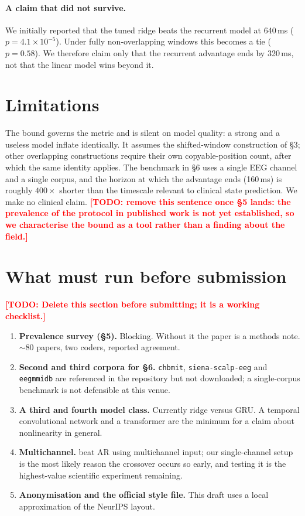 \documentclass{article}
\newcommand{\TODO}[1]{\textcolor{red}{\textbf{[TODO: #1]}}}
\begin{document}
\paragraph{A claim that did not survive.} We initially reported that the tuned
ridge beats the recurrent model at 640\,ms ($p=4.1\times10^{-5}$). Under fully
non-overlapping windows this becomes a tie ($p=0.58$). We therefore claim only that
the recurrent advantage ends by 320\,ms, not that the linear model wins beyond it.

\section{Limitations}

The bound governs the metric and is silent on model quality: a strong and a useless
model inflate identically. It assumes the shifted-window construction of \S3;
other overlapping constructions require their own copyable-position count, after
which the same identity applies. The benchmark in \S6 uses a single EEG channel and
a single corpus, and the horizon at which the advantage ends (160\,ms) is roughly
$400\times$ shorter than the timescale relevant to clinical state prediction. We
make no clinical claim. \TODO{remove this sentence once \S5 lands: the prevalence
of the protocol in published work is not yet established, so we characterise the
bound as a tool rather than a finding about the field.}

\section{What must run before submission}

\TODO{Delete this section before submitting; it is a working checklist.}
\begin{enumerate}\itemsep2pt
\item \textbf{Prevalence survey (\S5).} Blocking. Without it the paper is a
methods note. $\sim$80 papers, two coders, reported agreement.
\item \textbf{Second and third corpora for \S6.} \texttt{chbmit},
\texttt{siena-scalp-eeg} and \texttt{eegmmidb} are referenced in the repository
but not downloaded; a single-corpus benchmark is not defensible at this venue.
\item \textbf{A third and fourth model class.} Currently ridge versus GRU. A
temporal convolutional network and a transformer are the minimum for a claim about
nonlinearity in general.
\item \textbf{Multichannel.} \citet{onojima2025} beat AR using multichannel input;
our single-channel setup is the most likely reason the crossover occurs so early,
and testing it is the highest-value scientific experiment remaining.
\item \textbf{Anonymisation and the official style file.} This draft uses a local
approximation of the NeurIPS layout.
\end{enumerate}
\end{document}
